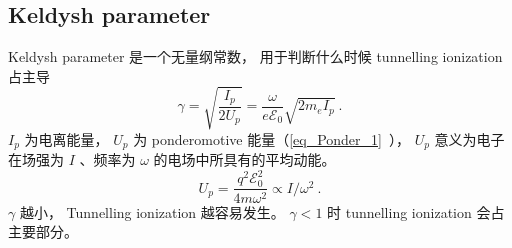 
\begin{issues}
\issueDraft
\end{issues}


\subsection{Keldysh parameter}
Keldysh parameter 是一个无量纲常数， 用于判断什么时候 tunnelling ionization 占主导
\begin{equation}
\gamma = \sqrt{\frac{I_p}{2U_p}} = \frac{\omega}{e\mathcal E_0} \sqrt{2m_e I_p}~.
\end{equation}
$I_p$ 为电离能量， $U_p$ 为 ponderomotive 能量（\autoref{eq_Ponder_1}~）， $U_p$ 意义为电子在场强为 $I$ 、频率为 $\omega$ 的电场中所具有的平均动能。
\begin{equation}
U_p = \frac{q^2 \mathcal E_0^2}{4m\omega^2} \propto I/\omega^2~.
\end{equation}
$\gamma$ 越小， Tunnelling ionization 越容易发生。 $\gamma < 1$ 时 tunnelling ionization 会占主要部分。
